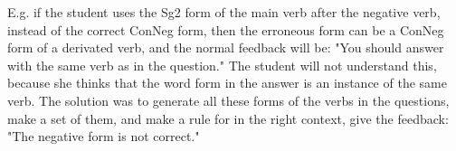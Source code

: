 \documentclass[11pt]{article}
\begin{document}
E.g. if the student uses the Sg2 form of the main verb after the negative verb, instead of the correct ConNeg form, then the erroneous form can be a ConNeg form of a derivated verb, and the normal feedback will be: "You should answer with the same verb as in the question." The student will not understand this, because she thinks that the word form in the answer is an instance of the same verb. The solution was to generate all these forms of the verbs in the questions, make a set of them, and make a rule for in the right context, give the feedback: "The negative form is not correct." 

%
%
%
\end{document}
